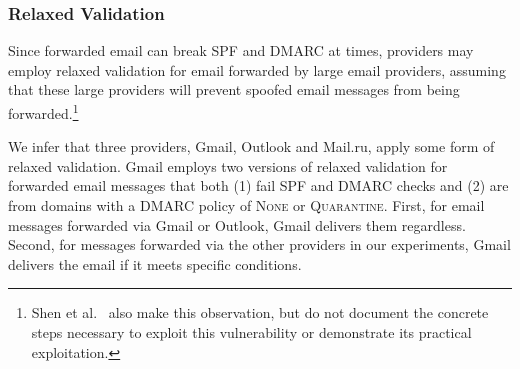 \subsubsection{Relaxed Validation}
\label{subsubsec:relaxed_validation}
Since forwarded email can break SPF and DMARC at times, providers may employ relaxed validation for email forwarded by large email providers, assuming that these large providers will
prevent spoofed email messages from being forwarded.\footnote{Shen et al.~\cite{shen2020weak} also make this observation, but do not document the concrete steps necessary to exploit this vulnerability or demonstrate its practical exploitation.}


We infer that three providers, Gmail, Outlook and Mail.ru, apply some form of relaxed validation. Gmail employs two versions of relaxed validation for forwarded email messages that both (1) fail SPF and DMARC checks and (2) are from domains with a DMARC policy of \textsc{None} or \textsc{Quarantine}.
First, for email messages forwarded via Gmail or Outlook, Gmail delivers them regardless.
Second, for messages forwarded via
the other providers in our experiments,
Gmail delivers the email if it meets specific conditions.

